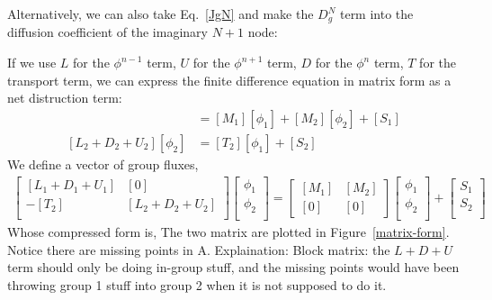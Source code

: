 \documentclass{school-22.211-notes}
\begin{document}
Alternatively, we can also take Eq.~\ref{JgN} and make the $D_g^N$ term into the diffusion coefficient of the imaginary $N+1$ node: 


 \label{matrix-representation-of-1d-slab}
If we use $L$ for the $\phi^{n-1}$ term, $U$ for the $\phi^{n+1}$ term, $D$ for the $\phi^n$ term, $T$ for the transport term, we can express the finite difference equation in matrix form as a net distruction term: 
\begin{align}
[L_1 + D_1 + U_1] [\phi_1] &= [M_1] [\phi_1] + [M_2][\phi_2] + [S_1] \\
[L_2 + D_2 + U_2] [\phi_2] &= [T_2] [\phi_1] + [S_2] 
\end{align}
We define a vector of group fluxes, 
\begin{align}
\left[ \begin{array}{cc} 
[L_1 + D_1 + U_1] & [0] \\
-[T_2] & [L_2 + D_2 + U_2] \\
\end{array} \right] 
\left[ \begin{array}{c}
\phi_1 \\ \phi_2 \\ \end{array} \right] 
= \left[ {\begin{array}{cc} \left[M_1\right] & \left[M_2\right] \\ \left[0\right] & \left[0\right] \end{array}} \right] 
\left[ \begin{array}{c}
\phi_1 \\ \phi_2 \\ \end{array} \right] 
+ 
\left[ \begin{array}{c} 
S_1 \\ S_2 \\ \end{array} \right] 
\end{align}
Whose compressed form is, 
\eqn{ [A] [\phi] = [M] [\phi] + [S] }
The two matrix are plotted in Figure~\ref{matrix-form}. Notice there are missing points in A. Explaination: Block matrix: the $L+D+U$ term should only be doing in-group stuff, and the missing points would have been throwing group 1 stuff into group 2 when it is not supposed to do it. 
\end{document}
